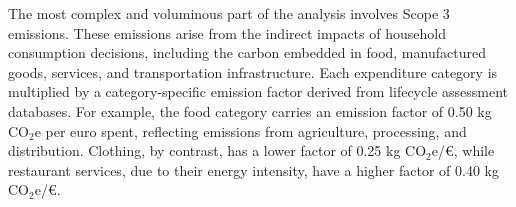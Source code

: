 \documentclass[12pt,a4paper]{article}%
\begin{document}
The most complex and voluminous part of the analysis involves Scope 3 emissions. These emissions arise from the indirect impacts of household consumption decisions, including the carbon embedded in food, manufactured goods, services, and transportation infrastructure. Each expenditure category is multiplied by a category-specific emission factor derived from lifecycle assessment databases. For example, the food category carries an emission factor of 0.50 kg CO$_2$e per euro spent, reflecting emissions from agriculture, processing, and distribution. Clothing, by contrast, has a lower factor of 0.25 kg CO$_2$e/€, while restaurant services, due to their energy intensity, have a higher factor of 0.40 kg CO$_2$e/€.


\begin{table}[h]
\centering
\caption{Consumption-Based Emissions (Scope 3)}\label{tab:scope3}
\end{table}
\end{document}
